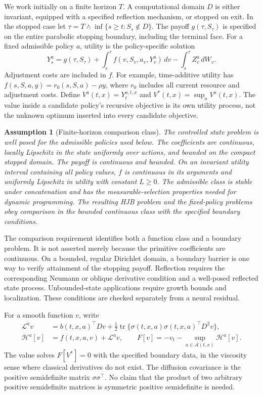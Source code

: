 \documentclass[ecta,nameyear,draft]{econsocart}
\newtheorem{assumption}{Assumption}
\theoremstyle{definition}
\theoremstyle{remark}
\newcommand{\HH}{\mathcal H}
\newcommand{\LL}{\mathcal L}
\newcommand{\Act}{\mathcal A}
\newcommand{\tr}{\operatorname{tr}}
\begin{document}
We work initially on a finite horizon $T$. A computational domain $D$ is either invariant, equipped with a specified reflection mechanism, or stopped on exit. In the stopped case let $\tau=T\wedge\inf\{s\geq t:S_s\notin D\}$. The payoff $g(\tau,S_\tau)$ is specified on the entire parabolic stopping boundary, including the terminal face. For a fixed admissible policy $a$, utility is the policy-specific solution
\begin{equation}\label{eq:bsde}
 Y_s^a=g(\tau,S_\tau)+\int_s^\tau f(v,S_v,a_v,Y_v^a)\,dv
                    -\int_s^\tau Z_v^a\,dW_v.
\end{equation}
Adjustment costs are included in $f$. For example, time-additive utility has $f(s,S,a,y)=r_0(s,S,a)-\rho y$, where $r_0$ includes all current resource and adjustment costs. Define $V^a(t,x)=Y_t^{a,t,x}$ and $V^*(t,x)=\sup_a V^a(t,x)$. The value inside a candidate policy's recursive objective is its own utility process, not the unknown optimum inserted into every candidate objective.

\begin{assumption}[Finite-horizon comparison class]\label{ass:model}
The controlled state problem is well posed for the admissible policies used below. The coefficients are continuous, locally Lipschitz in the state uniformly over actions, and bounded on the compact stopped domain. The payoff is continuous and bounded. On an invariant utility interval containing all policy values, $f$ is continuous in its arguments and uniformly Lipschitz in utility with constant $L\geq0$. The admissible class is stable under concatenation and has the measurable-selection properties needed for dynamic programming. The resulting HJB problem and the fixed-policy problems obey comparison in the bounded continuous class with the specified boundary conditions.
\end{assumption}

The comparison requirement identifies both a function class and a boundary problem. It is not asserted merely because the primitive coefficients are continuous. On a bounded, regular Dirichlet domain, a boundary barrier is one way to verify attainment of the stopping payoff. Reflection requires the corresponding Neumann or oblique derivative condition and a well-posed reflected state process. Unbounded-state applications require growth bounds and localization. These conditions are checked separately from a neural residual.

For a smooth function $v$, write
\begin{align}
 \LL^a v&=b(t,x,a)^\top Dv+\tfrac12\tr\{\sigma(t,x,a)\sigma(t,x,a)^\top D^2v\},\label{eq:generator}\\
 \HH^a[v]&=f(t,x,a,v)+\LL^a v,\qquad
 F[v]=-v_t-\sup_{a\in\Act(t,x)}\HH^a[v].\label{eq:hjb}
\end{align}
The value solves $F[V^*]=0$ with the specified boundary data, in the viscosity sense where classical derivatives do not exist. The diffusion covariance is the positive semidefinite matrix $\sigma\sigma^\top$. No claim that the product of two arbitrary positive semidefinite matrices is symmetric positive semidefinite is needed.
\end{document}
